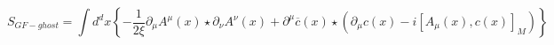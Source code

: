 \begin{equation}
 S_{GF-ghost}=\int
 d^{d}x\left\{-\frac{1}{2\xi}\partial_{\mu}A^{\mu}(x)\star\partial_{\nu}A^{\nu}(x)
 +\partial^{\mu}\overline{c}(x)\star\left(\partial_{\mu}c(x)-i[A_{\mu}(x),c(x)]_{M}\right)\right\}
 \end{equation}

